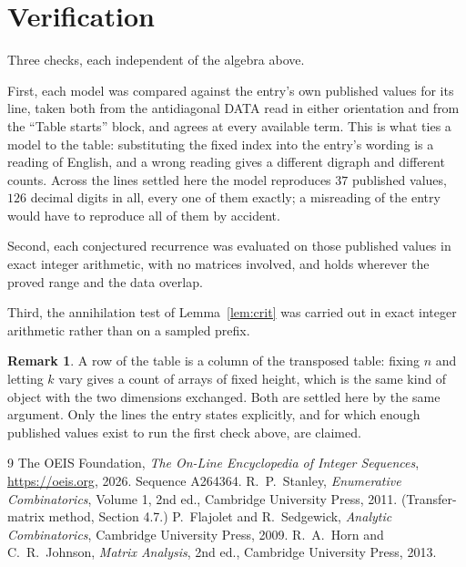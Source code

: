 \documentclass[11pt,a4paper]{article}
\theoremstyle{plain}
\theoremstyle{definition}
\newtheorem{remark}[theorem]{Remark}
\begin{document}
\section{Verification}

Three checks, each independent of the algebra above.

First, each model was compared against the entry's own published values for its line, taken
both from the antidiagonal DATA read in either orientation and from the ``Table starts''
block, and agrees at every available term. This is what ties a model to the table:
substituting the fixed index into the entry's wording is a reading of English, and a wrong
reading gives a different digraph and different counts. Across the lines settled here the
model reproduces $37$ published values, $126$ decimal digits in all, every one of
them exactly; a misreading of the entry would have to reproduce all of them by accident.

Second, each conjectured recurrence was evaluated on those published values in exact
integer arithmetic, with no matrices involved, and holds wherever the proved range and the
data overlap.

Third, the annihilation test of Lemma~\ref{lem:crit} was carried out in exact integer
arithmetic rather than on a sampled prefix.

\begin{remark}
A row of the table is a column of the transposed table: fixing $n$ and letting $k$ vary gives a
count of arrays of fixed height, which is the same kind of object with the two dimensions
exchanged. Both are settled here by the same argument. Only the lines the entry states
explicitly, and for which enough published values exist to run the first check above, are
claimed.
\end{remark}

\begin{thebibliography}{9}
 The OEIS Foundation, \emph{The On-Line Encyclopedia of Integer
Sequences}, \url{https://oeis.org}, 2026. Sequence A264364.
 R.~P.~Stanley, \emph{Enumerative Combinatorics}, Volume 1, 2nd ed.,
Cambridge University Press, 2011. (Transfer-matrix method, Section 4.7.)
 P.~Flajolet and R.~Sedgewick, \emph{Analytic Combinatorics}, Cambridge
University Press, 2009.
 R.~A.~Horn and C.~R.~Johnson, \emph{Matrix Analysis}, 2nd ed., Cambridge
University Press, 2013.
\end{thebibliography}
\end{document}
